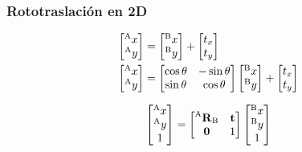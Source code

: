 \begin{frame}
    \frametitle{Rototraslación en 2D}

    \begin{align*}
        \begin{bmatrix}
            \toCoord{x}{A}\\
            \toCoord{y}{A}
        \end{bmatrix} &=
        \begin{bmatrix}
            \toCoord{x}{B}\\
            \toCoord{y}{B}
        \end{bmatrix} +
        \begin{bmatrix}
            t_x\\
            t_y
        \end{bmatrix}\\
        \begin{bmatrix}
            \toCoord{x}{A}\\
            \toCoord{y}{A}
        \end{bmatrix} &=
        \begin{bmatrix}
            \cos \theta &-\sin \theta \\
            \sin \theta &\cos \theta \\
        \end{bmatrix}
        \begin{bmatrix}
            \toCoord{x}{B}\\
            \toCoord{y}{B}
        \end{bmatrix} +
        \begin{bmatrix}
            t_x\\
            t_y\\
        \end{bmatrix}
    \end{align*}

    \begin{equation*}
        \begin{bmatrix}
            \toCoord{x}{A}\\
            \toCoord{y}{A}\\
            1
        \end{bmatrix} =
        \begin{bmatrix}
            \rotationCoord{A}{B} & \translation\\
            \vec{0} & 1
        \end{bmatrix}
        \begin{bmatrix}
            \toCoord{x}{B}\\
            \toCoord{y}{B}\\
            1
        \end{bmatrix}
    \end{equation*}


\end{frame}

